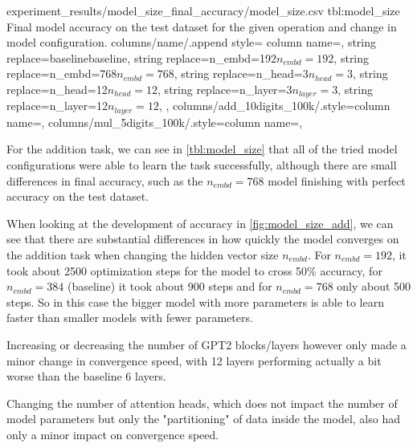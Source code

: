 {experiment_results/model_size_final_accuracy/model_size.csv}
{tbl:model_size}
{Final model accuracy on the test dataset for the given operation and change in model configuration.}
{%
    columns/name/.append style={
        column name={},
        string replace={baseline}{baseline},
        string replace={n_embd=192}{$n_{embd}=192$},
        string replace={n_embd=768}{$n_{embd}=768$},
        string replace={n_head=3}{$n_{head}=3$},
        string replace={n_head=12}{$n_{head}=12$},
        string replace={n_layer=3}{$n_{layer}=3$},
        string replace={n_layer=12}{$n_{layer}=12$},
    },
    columns/add_10digits_100k/.style={column name={}},
    columns/mul_5digits_100k/.style={column name={}},
}



For the addition task, we can see in \cref{tbl:model_size} that all of the tried model configurations were able to learn the task successfully, although there are small differences in final accuracy, such as the $n_{embd}=768$ model finishing with perfect accuracy on the test dataset.

When looking at the development of accuracy in \cref{fig:model_size_add}, we can see that there are substantial differences in how quickly the model converges on the addition task when changing the hidden vector size $n_{embd}$. For $n_{embd}=192$, it took about 2500 optimization steps for the model to cross 50\% accuracy, for $n_{embd}=384$ (baseline) it took about 900 steps and for $n_{embd}=768$ only about 500 steps. So in this case the bigger model with more parameters is able to learn faster than smaller models with fewer parameters.

Increasing or decreasing the number of GPT2 blocks/layers however only made a minor change in convergence speed, with 12 layers performing actually a bit worse than the baseline 6 layers.

Changing the number of attention heads, which does not impact the number of model parameters but only the "partitioning" of data inside the model, also had only a minor impact on convergence speed.


